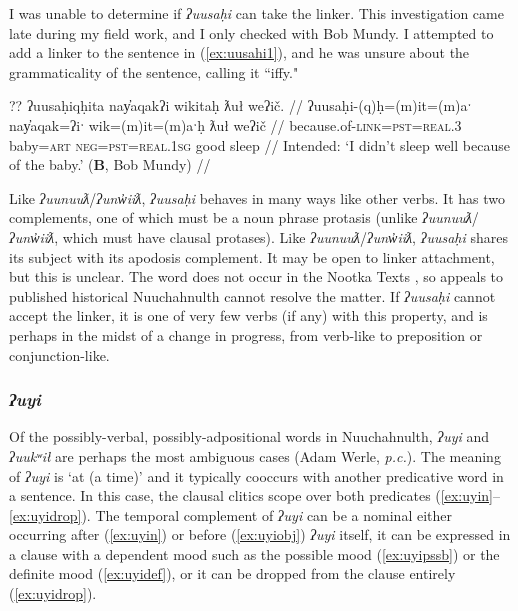 I was unable to determine if \textit{ʔuusaḥi} can take the linker. This investigation came late during my field work, and I only checked with Bob Mundy. I attempted to add a linker to the sentence in (\ref{ex:uusahi1}), and he was unsure about the grammaticality of the sentence, calling it ``iffy."

\ex \label{ex:uusahi7}
\begingl
\glpreamble ?? ʔuusaḥiqḥita nay̓aqakʔi wikitaḥ ƛuł weʔič. //
\gla ʔuusaḥi-(q)ḥ=(m)it=(m)aˑ nay̓aqak=ʔiˑ wik=(m)it=(m)aˑḥ ƛuł weʔič //
\glb because.of-\textsc{link}=\textsc{pst}=\textsc{real.3} baby=\textsc{art} \textsc{neg}=\textsc{pst}=\textsc{real.1sg} good sleep //
\glft Intended: `I didn't sleep well because of the baby.' (\textbf{B}, Bob Mundy) //
\endgl
\xe

Like \textit{ʔuunuuƛ}/\textit{ʔunw̓iiƛ}, \textit{ʔuusaḥi} behaves in many ways like other verbs. It has two complements, one of which must be a noun phrase protasis (unlike \textit{ʔuunuuƛ}/\textit{ʔunw̓iiƛ}, which must have clausal protases). Like \textit{ʔuunuuƛ}/\textit{ʔunw̓iiƛ}, \textit{ʔuusaḥi} shares its subject with its apodosis complement. It may be open to linker attachment, but this is unclear. The word does not occur in the Nootka Texts \citep{sapir1939, sapir1955}, so appeals to published historical Nuuchahnulth cannot resolve the matter. If \textit{ʔuusaḥi} cannot accept the linker, it is one of very few verbs (if any) with this property, and is perhaps in the midst of a change in progress, from verb-like to preposition or conjunction-like.

\subsubsection{\textit{ʔuyi}} \label{sec:link:uyi}

Of the possibly-verbal, possibly-adpositional words in Nuuchahnulth, \textit{ʔuyi} and \textit{ʔuukʷił} are perhaps the most ambiguous cases (Adam Werle, \textit{p.c.}). The meaning of \textit{ʔuyi} is `at (a time)' and it typically cooccurs with another predicative word in a sentence. In this case, the clausal clitics scope over both predicates (\ref{ex:uyin}--\ref{ex:uyidrop}). The temporal complement of \textit{ʔuyi} can be a nominal either occurring after (\ref{ex:uyin}) or before (\ref{ex:uyiobj}) \textit{ʔuyi} itself, it can be expressed in a clause with a dependent mood such as the possible mood (\ref{ex:uyipssb}) or the definite mood (\ref{ex:uyidef}), or it can be dropped from the clause entirely (\ref{ex:uyidrop}).

